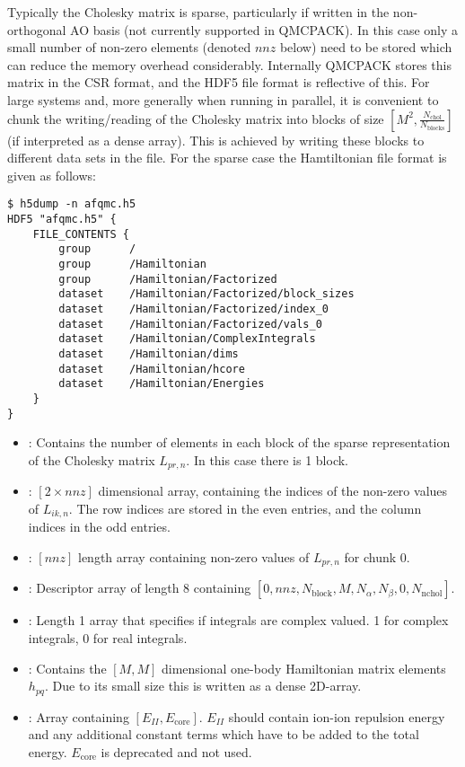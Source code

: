 Typically the Cholesky matrix is sparse, particularly if written in the non-orthogonal AO basis (not currently supported in QMCPACK). In this case only a small number of non-zero elements (denoted $nnz$ below) need to be stored which can reduce the memory overhead considerably.
Internally QMCPACK stores this matrix in the CSR format, and the HDF5 file format is reflective of this.
For large systems and, more generally when running in parallel, it is convenient to chunk the writing/reading of the Cholesky matrix into blocks of size $[M^2,\frac{N_{\mathrm{chol}}}{N_{\mathrm{blocks}}}]$ (if interpreted as a dense array).
This is achieved by writing these blocks to different data sets in the file.
For the sparse case the Hamtiltonian file format is given as follows:
\begin{lstlisting}[style=SHELL,caption=Sample Sparse Cholesky QMCPACK Hamtiltonian.]
$ h5dump -n afqmc.h5
HDF5 "afqmc.h5" {
    FILE_CONTENTS {
        group      /
        group      /Hamiltonian
        group      /Hamiltonian/Factorized
        dataset    /Hamiltonian/Factorized/block_sizes
        dataset    /Hamiltonian/Factorized/index_0
        dataset    /Hamiltonian/Factorized/vals_0
        dataset    /Hamiltonian/ComplexIntegrals
        dataset    /Hamiltonian/dims
        dataset    /Hamiltonian/hcore
        dataset    /Hamiltonian/Energies
    }
}
\end{lstlisting}
\begin{itemize}
    \item {}: Contains the number of elements in each block of the sparse representation of the Cholesky matrix $L_{pr,n}$. In this case there is 1 block.
    \item {}: $[2\times nnz]$ dimensional array, containing the indices of the non-zero values of $L_{ik,n}$. The row indices are stored in the even entries, and the column indices in the odd entries.
    \item {}: $[nnz]$ length array containing non-zero values of $L_{pr,n}$ for chunk 0.
    \item {}: Descriptor array of length 8 containing $[0,nnz,N_{\mathrm{block}},M,N_\alpha,N_\beta,0,N_\mathrm{nchol}]$.
    \item {}: Length 1 array that specifies if integrals are complex valued. 1 for complex integrals, 0 for real integrals.
    \item {}: Contains the $[M,M]$ dimensional one-body Hamiltonian matrix elements $h_{pq}$. Due to its small size this is written as a dense 2D-array.
    \item {}: Array containing $[E_{II}, E_{\mathrm{core}}]$. $E_{II}$ should contain ion-ion repulsion energy and any additional constant terms which have to be added to the total energy. $E_{\mathrm{core}}$ is deprecated and not used.
\end{itemize}

